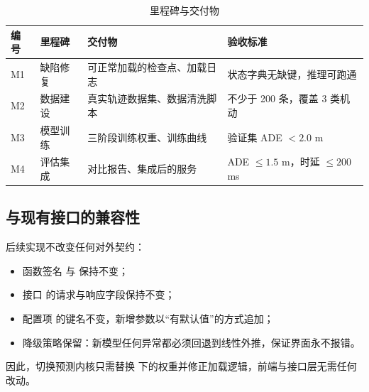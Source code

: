 \begin{table}[H]
\centering
\caption{里程碑与交付物}
\label{tab:milestone}
\small
\begin{tabularx}{\linewidth}{@{}>{\heiti}p{1.4cm}>{\heiti}p{3.4cm}p{4.0cm}X@{}}
\toprule
编号 & 里程碑 & 交付物 & 验收标准 \\
\midrule
M1 & 缺陷修复 & 可正常加载的检查点、加载日志 & 状态字典无缺键，推理可跑通 \\
M2 & 数据建设 & 真实轨迹数据集、数据清洗脚本 & 不少于 200 条，覆盖 3 类机动 \\
M3 & 模型训练 & 三阶段训练权重、训练曲线 & 验证集 ADE $<2.0$ m \\
M4 & 评估集成 & 对比报告、集成后的服务 & ADE $\leq1.5$ m，时延 $\leq200$ ms \\
\bottomrule
\end{tabularx}
\end{table}

\subsection{与现有接口的兼容性}

后续实现不改变任何对外契约：

\begin{itemize}
  \item 函数签名  与  保持不变；
  \item 接口  的请求与响应字段保持不变；
  \item 配置项  的键名不变，新增参数以“有默认值”的方式追加；
  \item 降级策略保留：新模型任何异常都必须回退到线性外推，保证界面永不报错。
\end{itemize}

因此，切换预测内核只需替换  下的权重并修正加载逻辑，前端与接口层无需任何改动。
